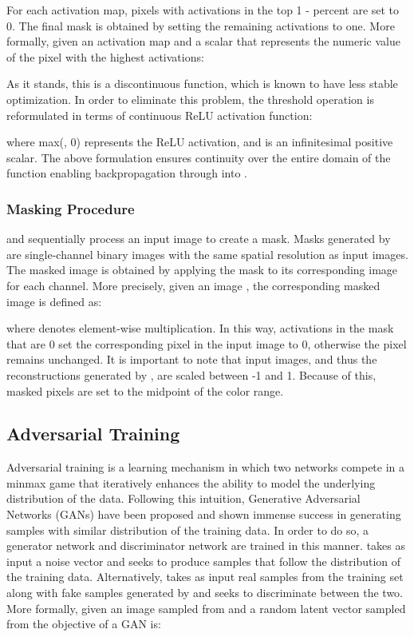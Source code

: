 \documentclass[10pt,twocolumn,letterpaper]{article}
\begin{document}
For each activation map, pixels with activations in the top 1 -  percent are set to 0. The final mask is obtained by setting the remaining activations to one. More formally, given an activation map  and a scalar  that represents the numeric value of the pixel with the  highest activations:



As it stands, this is a discontinuous function, which is known to have less stable optimization. In order to eliminate this problem, the threshold operation is reformulated in terms of continuous ReLU activation function:



where max(, 0) represents the ReLU activation, and  is an infinitesimal positive scalar. The above formulation ensures continuity over the entire domain of the function enabling backpropagation through  into . 

\subsubsection{Masking Procedure} 
 and  sequentially process an input image to create a mask. Masks generated by  are single-channel binary images with the same spatial resolution as input images. The masked image is obtained by applying the mask to its corresponding image for each channel. More precisely, given an image , the corresponding masked image  is defined as:



where  denotes element-wise multiplication. In this way, activations in the mask that are 0 set the corresponding pixel in the input image to 0, otherwise the pixel remains unchanged. It is important to note that input images, and thus the reconstructions generated by , are scaled between -1 and 1. Because of this, masked pixels are set to the midpoint of the color range.  

\subsection{Adversarial Training} 
Adversarial training is a learning mechanism in which two networks compete in a minmax game that iteratively enhances the ability to model the underlying distribution of the data. Following this intuition, Generative Adversarial Networks (GANs) \cite{goodfellow2014generative} have been proposed and shown immense success in generating samples with similar distribution of the training data. In order to do so, a generator network  and discriminator network  are trained in this manner.  takes as input a noise vector and seeks to produce samples that follow the distribution of the training data. Alternatively,  takes as input real samples from the training set along with fake samples generated by  and seeks to discriminate between the two. More formally, given an image  sampled from  and a random latent vector  sampled from  the objective of a GAN is: 
\end{document}
